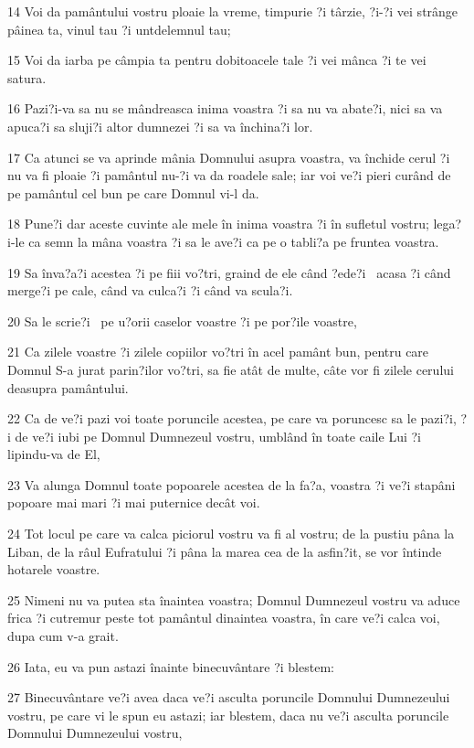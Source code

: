\par 14 Voi da pamântului vostru ploaie la vreme, timpurie ?i târzie, ?i-?i vei strânge pâinea ta, vinul tau ?i untdelemnul tau;
\par 15 Voi da iarba pe câmpia ta pentru dobitoacele tale ?i vei mânca ?i te vei satura.
\par 16 Pazi?i-va sa nu se mândreasca inima voastra ?i sa nu va abate?i, nici sa va apuca?i sa sluji?i altor dumnezei ?i sa va închina?i lor.
\par 17 Ca atunci se va aprinde mânia Domnului asupra voastra, va închide cerul ?i nu va fi ploaie ?i pamântul nu-?i va da roadele sale; iar voi ve?i pieri curând de pe pamântul cel bun pe care Domnul vi-l da.
\par 18 Pune?i dar aceste cuvinte ale mele în inima voastra ?i în sufletul vostru; lega?i-le ca semn la mâna voastra ?i sa le ave?i ca pe o tabli?a pe fruntea voastra.
\par 19 Sa înva?a?i acestea ?i pe fiii vo?tri, graind de ele când ?ede?i  acasa ?i când merge?i pe cale, când va culca?i ?i când va scula?i.
\par 20 Sa le scrie?i  pe u?orii caselor voastre ?i pe por?ile voastre,
\par 21 Ca zilele voastre ?i zilele copiilor vo?tri în acel pamânt bun, pentru care Domnul S-a jurat parin?ilor vo?tri, sa fie atât de multe, câte vor fi zilele cerului deasupra pamântului.
\par 22 Ca de ve?i pazi voi toate poruncile acestea, pe care va poruncesc sa le pazi?i, ?i de ve?i iubi pe Domnul Dumnezeul vostru, umblând în toate caile Lui ?i lipindu-va de El,
\par 23 Va alunga Domnul toate popoarele acestea de la fa?a, voastra ?i ve?i stapâni popoare mai mari ?i mai puternice decât voi.
\par 24 Tot locul pe care va calca piciorul vostru va fi al vostru; de la pustiu pâna la Liban, de la râul Eufratului ?i pâna la marea cea de la asfin?it, se vor întinde hotarele voastre.
\par 25 Nimeni nu va putea sta înaintea voastra; Domnul Dumnezeul vostru va aduce frica ?i cutremur peste tot pamântul dinaintea voastra, în care ve?i calca voi, dupa cum v-a grait.
\par 26 Iata, eu va pun astazi înainte binecuvântare ?i blestem:
\par 27 Binecuvântare ve?i avea daca ve?i asculta poruncile Domnului Dumnezeului vostru, pe care vi le spun eu astazi; iar blestem, daca nu ve?i asculta poruncile Domnului Dumnezeului vostru,
